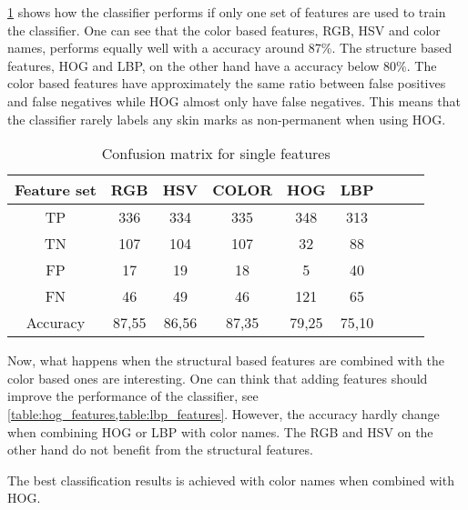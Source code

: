 \cref{table:single_feature} shows how the classifier performs if only one set of features are used to train the classifier. One can see that the color based features, RGB, HSV and color names, performs equally well with a accuracy around 87\%. The structure based features, HOG and LBP, on the other hand have a accuracy below 80\%. The color based features have approximately the same ratio between false positives and false negatives while HOG almost only have false negatives. This means that the classifier rarely labels any skin marks as non-permanent when using HOG.  

\FloatBarrier
\begin{table}[h!]
\begin{center}
	\caption{Confusion matrix for single features}
	\begin{tabular}{|c|c|c|c|c|c|c|c|c|}
		\hline
		Feature set &  RGB  &  HSV  & COLOR &  HOG  &  LBP    \\ \hline
		    TP      &  336  &  334  &  335  &  348  &  313    \\ \hline
		    TN      &  107  &  104  &  107  &  32   &  88     \\ \hline
		    FP      &  17   &  19   &  18   &   5   &  40     \\ \hline
		    FN      &  46   &  49   &  46   &  121  &  65     \\ \hline
		 Accuracy   & 87,55 & 86,56 & 87,35 & 79,25 & 75,10   \\ \hline
	\end{tabular}
\label{table:single_feature}
\end{center}
\end{table}
\FloatBarrier

Now, what happens when the structural based features are combined with the color based ones are interesting. One can think that adding features should improve the performance of the classifier, see \cref{table:hog_features,table:lbp_features}. However, the accuracy hardly change when combining HOG or LBP with color names. The RGB and HSV on the other hand do not benefit from the structural features. 

The best classification results is achieved with color names when combined with HOG.

